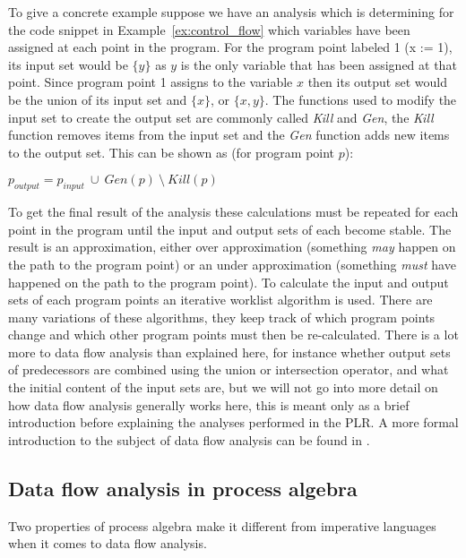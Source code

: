 	To give a concrete example suppose we have an analysis which is determining 
	for the code snippet in Example~\ref{ex:control_flow} which variables have 
	been assigned at each point in the program. For the program point labeled 1 
	(x := 1), its input set would be $\{y\}$ as $y$ is the only variable that 
	has been assigned at that point. Since program point 1 assigns to the 
	variable $x$ then its output set would be the union of its input set and 
	$\{x\}$, or $\{x,y\}$. The functions used to modify the input set to create 
	the output set are commonly called \textit{Kill} and \textit{Gen}, the 
	\textit{Kill} function removes items from the input set and the \textit{Gen} 
	function adds new items to the output set. This can be shown as (for program 
	point $p$):
	
	\begin{center}
	$p_{output} = p_{input}\ \cup\ Gen(p)\ \setminus\ Kill(p) $
	\end{center}
	
	To get the final result of the analysis these calculations must be repeated 
	for each point in the program until the input and output sets of each become 
	stable. The result is an approximation, either over approximation (something 
	\textit{may} happen on the path to the program point) or an 
	under approximation (something \textit{must} have happened on the path to 
	the program point).  To calculate the input and output sets of each program 
	points an iterative worklist algorithm is used. There are many variations of 
	these algorithms, they keep track of which program points change and which 
	other program points must then be re-calculated. There is a lot more to data 
	flow analysis than explained here, for instance whether output sets of 
	predecessors are combined using the union or intersection operator, and what 
	the initial content of the input sets are, but we will not go into more 
	detail on how data flow analysis generally works here, this is meant only as 
	a brief introduction before explaining the analyses performed in the PLR. A 
	more formal introduction to the subject of data flow analysis can be found 
	in \cite{program_analysis}.
	
	\subsection{Data flow analysis in process algebra}
	
	Two properties of process algebra make it different from imperative 	
	languages when it comes to data flow analysis.
	
